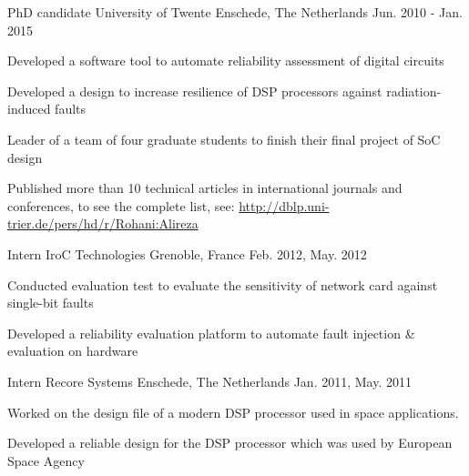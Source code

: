 \begin{cventries}
  \cventry
    {PhD candidate} %
    {University of Twente} %
    {Enschede, The Netherlands} %
    {Jun. 2010 - Jan. 2015} %
    {
      \begin{cvitems} %
	\item {Developed a software tool to automate reliability assessment of digital circuits}
        \item {Developed a design to increase resilience of DSP processors against radiation-induced faults}
        \item {Leader of a team of four graduate students to finish their final project of SoC design}
	\item{Published more than 10 technical articles in international journals and conferences, to see the complete list, see: \newline \href{www.dblp.uni-trier.de/pers/hd/r/Rohani:Alireza} {http://dblp.uni-trier.de/pers/hd/r/Rohani:Alireza}}
      \end{cvitems}
    }

  \cventry
    {Intern} %
    {IroC Technologies} %
    {Grenoble, France} %
    {Feb. 2012, May. 2012} %
    {
      \begin{cvitems} %
        \item {Conducted evaluation test to evaluate the sensitivity of network card against single-bit faults}
        \item {Developed a reliability evaluation platform to automate fault injection \&  evaluation on hardware}
	\end{cvitems}
	}
  \cventry
    {Intern} %
    {Recore Systems} %
    {Enschede, The Netherlands} %
    {Jan. 2011, May. 2011} %
    {
      \begin{cvitems} %
        \item {Worked on the design file of a modern DSP processor used in space applications.}
        \item {Developed a reliable design for the DSP processor which was used by European Space Agency}
      \end{cvitems}
    }

\end{cventries}
